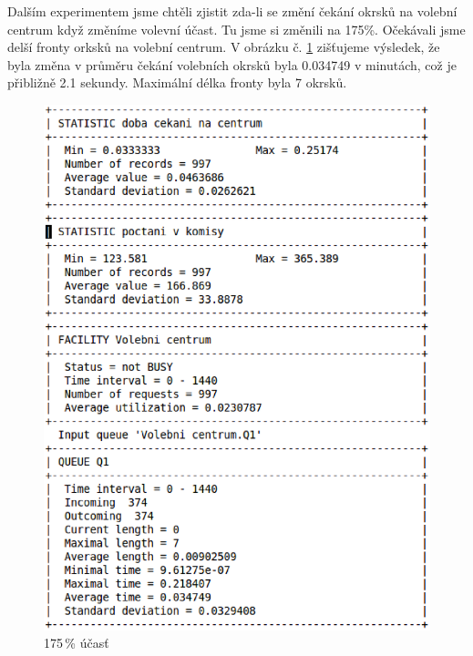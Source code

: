 \documentclass[12pt,a4paper,titlepage,final]{article}
\begin{document}
\newline
\newline
\newpage
Dalším experimentem jsme chtěli zjistit zda-li se změní čekání okrsků na volební centrum když změníme volevní účast. Tu jsme si změnili na 175\%. Očekávali jsme delší fronty orksků na volební centrum. V obrázku č. \ref{obr3} zišťujeme výsledek, že byla změna v průměru čekání volebních okrsků byla 0.034749 v minutách, což je přibližně 2.1 sekundy. Maximální délka fronty byla 7 okrsků. \newline
\newline
\begin{figure}

\begin{center}

\includegraphics[scale=0.6]{img/1_75.eps} 
\caption{175\,\% účasť}
\label{obr3}

\end{center}

\end{figure}
\end{document}
